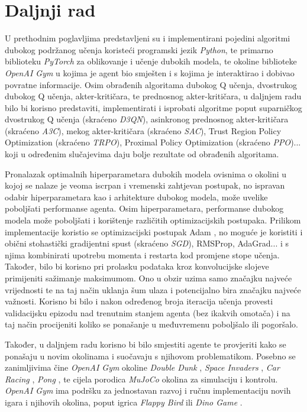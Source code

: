 \chapter{Daljnji rad}

U prethodnim poglavljima predstavljeni su i implementirani pojedini algoritmi dubokog podržanog učenja koristeći programski jezik \textit{Python}, te primarno biblioteku \textit{PyTorch} za oblikovanje i učenje dubokih modela, te okoline biblioteke \textit{OpenAI Gym} u kojima je agent bio smješten i s kojima je interaktirao i dobivao povratne informacije. Osim obrađenih algoritama dubokog Q učenja, dvostrukog dubokog Q učenja, akter-kritičara, te prednosnog akter-kritičara, u daljnjem radu bilo bi korisno predstaviti, implementirati i isprobati algoritme poput suparničkog dvostrukog Q učenja  (skraćeno \textit{D3QN}), asinkronog prednosnog akter-kritičara  (skraćeno \textit{A3C}), mekog akter-kritičara  (skraćeno \textit{SAC}), Trust Region Policy Optimization (skraćeno \textit{TRPO}), Proximal Policy Optimization (skraćeno \textit{PPO})... koji u određenim slučajevima daju bolje rezultate od obrađenih algoritama.

Pronalazak optimalnih hiperparametara dubokih modela ovisnima o okolini u kojoj se nalaze je veoma iscrpan i vremenski zahtjevan postupak, no ispravan odabir hiperparametara kao i arhitekture dubokog modela, može uvelike poboljšati performanse agenta. Osim hiperparametara, performanse dubokog modela može poboljšati i korištenje različitih optimizacijskih postupaka. Prilikom implementacije koristio se optimizacijski postupak Adam , no moguće je koristiti i obični stohastički gradijentni spust  (skraćeno \textit{SGD}), RMSProp, AdaGrad... i s njima kombinirati upotrebu momenta i restarta kod promjene stope učenja. Također, bilo bi korisno pri prolasku podataka kroz konvolucijske slojeve primijeniti sažimanje maksimumom. Ono u obzir uzima samo značajku najveće vrijednosti te na taj način uklanja šum ulaza i potencijalno bira značajku najveće važnosti. Korisno bi bilo i nakon određenog broja iteracija učenja provesti validacijsku epizodu nad trenutnim stanjem agenta (bez ikakvih omotača) i na taj način procijeniti koliko se ponašanje u međuvremenu poboljšalo ili pogoršalo.

Također, u daljnjem radu korisno bi bilo smjestiti agente te provjeriti kako se ponašaju u novim okolinama i suočavaju s njihovom problematikom. Posebno se zanimljivima čine \textit{OpenAI Gym} okoline \textit{Double Dunk} \cite{DoubleDunk}, \textit{Space Invaders} \cite{SpaceInvaders}, \textit{Car Racing} \cite{CarRacing}, \textit{Pong} \cite{Pong}, te cijela porodica \textit{MuJoCo} okolina za simulaciju i kontrolu. \textit{OpenAI Gym} ima podršku za jednostavan razvoj i ručnu implementaciju novih igara i njihovih okolina, poput igrica \textit{Flappy Bird} \cite{CustomFlappyBird} ili \textit{Dino Game} \cite{CustomDinoGame}.

